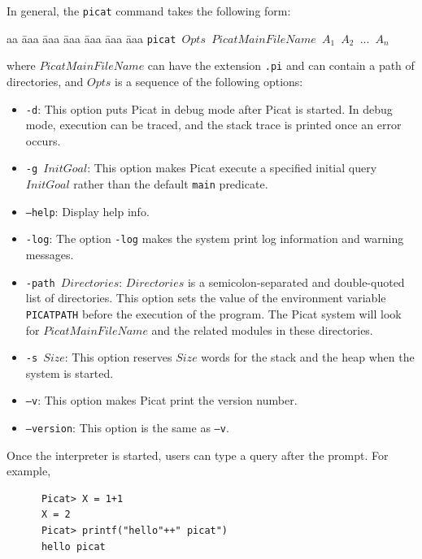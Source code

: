 In general, the \texttt{picat} command takes the following form:
\begin{tabbing}
aa \= aaa \= aaa \= aaa \= aaa \= aaa \= aaa \kill
\> \texttt{picat $Opts$ $PicatMainFileName$ $A_1$ $A_2$ $\ldots$ $A_n$}
\end{tabbing}
where $PicatMainFileName$ can have the extension \texttt{.pi} and can contain a path of directories, and $Opts$ is a sequence of the following options:
\begin{itemize}
\item \texttt{-d}: This option puts Picat in debug mode after Picat is started. In debug mode, execution can be traced, and the stack trace is printed once an error occurs.

\item \texttt{-g $InitGoal$}: This option makes Picat execute a specified initial query $InitGoal$ rather than the default \texttt{main} predicate.

\item \texttt{--help}: Display help info.

\item \texttt{-log}: The option \texttt{-log} makes the system print log information and warning messages. 

\item \texttt{-path $Directories$}: $Directories$ is a semicolon-separated and double-quoted list of directories. This option sets the value of the environment variable \texttt{PICATPATH} before the execution of the program. The Picat system will look for $PicatMainFileName$ and the related modules in these directories. 

\item \texttt{-s $Size$}: This option reserves $Size$ words for the stack and the heap when the system is started.

\item \texttt{--v}: This option makes Picat print the version number.
\item \texttt{--version}: This option is the same as \texttt{--v}.
\end{itemize}

Once the interpreter is started, users can type a query after the prompt. For example,
\begin{verbatim}
      Picat> X = 1+1
      X = 2
      Picat> printf("hello"++" picat")
      hello picat
\end{verbatim}

